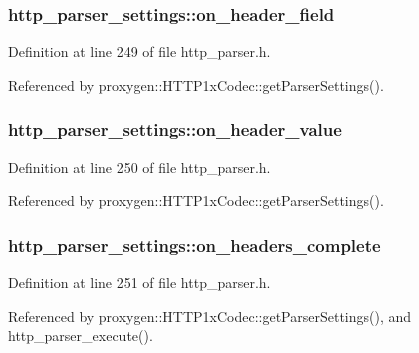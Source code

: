 \subsubsection[{on\+\_\+header\+\_\+field}]{ http\+\_\+parser\+\_\+settings\+::on\+\_\+header\+\_\+field}\label{structhttp__parser__settings_acfb3fd7947c5ff3e16649c71aa13bff2}


Definition at line 249 of file http\+\_\+parser.\+h.



Referenced by proxygen\+::\+H\+T\+T\+P1x\+Codec\+::get\+Parser\+Settings().

\subsubsection[{on\+\_\+header\+\_\+value}]{ http\+\_\+parser\+\_\+settings\+::on\+\_\+header\+\_\+value}\label{structhttp__parser__settings_a2af4e9085fa79ee52b31e626179bc561}


Definition at line 250 of file http\+\_\+parser.\+h.



Referenced by proxygen\+::\+H\+T\+T\+P1x\+Codec\+::get\+Parser\+Settings().

\subsubsection[{on\+\_\+headers\+\_\+complete}]{ http\+\_\+parser\+\_\+settings\+::on\+\_\+headers\+\_\+complete}\label{structhttp__parser__settings_a97f0c2e701e0e4f1198405e108d07620}


Definition at line 251 of file http\+\_\+parser.\+h.



Referenced by proxygen\+::\+H\+T\+T\+P1x\+Codec\+::get\+Parser\+Settings(), and http\+\_\+parser\+\_\+execute().

